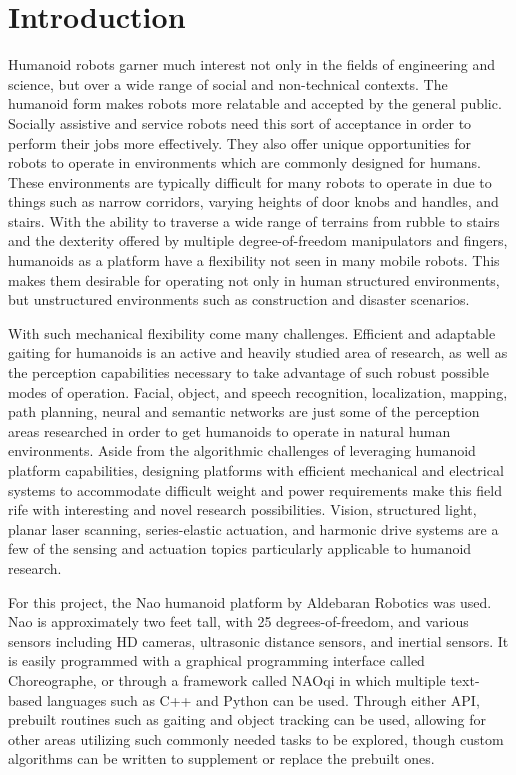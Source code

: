 \chapter{Introduction}

Humanoid robots garner much interest not only in the fields of engineering and science, but over a wide range of social and non-technical contexts. The humanoid form makes robots more relatable and accepted by the general public. Socially assistive and service robots need this sort of acceptance in order to perform their jobs more effectively. 
They also offer unique opportunities for robots to operate in environments which are commonly designed for humans. These environments are typically difficult for many robots to operate in due to things such as narrow corridors, varying heights of door knobs and handles, and stairs.
With the ability to traverse a wide range of terrains from rubble to stairs and the dexterity offered by multiple degree-of-freedom manipulators and fingers, humanoids as a platform have a flexibility not seen in many mobile robots. This makes them desirable for operating not only in human structured environments, but unstructured environments such as construction and disaster scenarios.

With such mechanical flexibility come many challenges. Efficient and adaptable gaiting for humanoids is an active and heavily studied area of research, as well as the perception capabilities necessary to take advantage of such robust possible modes of operation. Facial, object, and speech recognition, localization, mapping, path planning, neural and semantic networks are just some of the perception areas researched in order to get humanoids to operate in natural human environments.
Aside from the algorithmic challenges of leveraging humanoid platform capabilities, designing platforms with efficient mechanical and electrical systems to accommodate difficult weight and power requirements make this field rife with interesting and novel research possibilities. Vision, structured light, planar laser scanning, series-elastic actuation, and harmonic drive systems are a few of the sensing and actuation topics particularly applicable to humanoid research.

For this project, the Nao humanoid platform by Aldebaran Robotics was used. Nao is approximately two feet tall, with 25 degrees-of-freedom, and various sensors including HD cameras, ultrasonic distance sensors, and inertial sensors. It is easily programmed with a graphical programming interface called Choreographe, or through a framework called NAOqi in which multiple text-based languages such as C++ and Python can be used. Through either API, prebuilt routines such as gaiting and object tracking can be used, allowing for other areas utilizing such commonly needed tasks to be explored, though custom algorithms can be written to supplement or replace the prebuilt ones.

